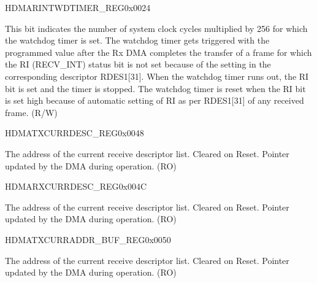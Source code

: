 \begin{register}{H}{DMARINTWDTIMER\_REG}{0x0024}\label{regdesc:DMARINTWDTIMERREG}
%
%
\regnewline%
\begin{regdesc}\begin{reglist}
\item [RIWTC]This bit indicates the number of system clock cycles multiplied by 256 for which the watchdog timer is set. The watchdog timer gets triggered with the programmed value after the Rx DMA completes the transfer of a frame for which the RI (RECV\_INT) status bit is not set because of the setting in the corresponding descriptor RDES1[31]. When the watchdog timer runs out, the RI bit is set and the timer is stopped. The watchdog timer is reset when the RI bit is set high because of automatic setting of RI as per RDES1[31] of any received frame. (R/W)
\end{reglist}\end{regdesc}
\end{register}


\begin{register}{H}{DMATXCURRDESC\_REG}{0x0048}\label{regdesc:DMATXCURRDESCREG}
%
\regnewline%
\begin{regdesc}\begin{reglist}
\item [TRANS\_DSCR\_ADDR\_PTR]The address of the current receive descriptor list. Cleared on Reset. Pointer updated by the DMA during operation. (RO)
\end{reglist}\end{regdesc}
\end{register}

\begin{register}{H}{DMARXCURRDESC\_REG}{0x004C}\label{regdesc:DMARXCURRDESCREG}
%
\regnewline%
\begin{regdesc}\begin{reglist}
\item [RECV\_DSCR\_ADDR\_PTR]The address of the current receive descriptor list. Cleared on Reset. Pointer updated by the DMA during operation. (RO)
\end{reglist}\end{regdesc}
\end{register}


\begin{register}{H}{DMATXCURRADDR\_BUF\_REG}{0x0050}\label{regdesc:DMATXCURRADDRBUFREG}
%
\regnewline%
\begin{regdesc}\begin{reglist}
\item [TRANS\_BUFF\_ADDR\_PTR]The address of the current receive descriptor list. Cleared on Reset. Pointer updated by the DMA during operation. (RO)
\end{reglist}\end{regdesc}
\end{register}


